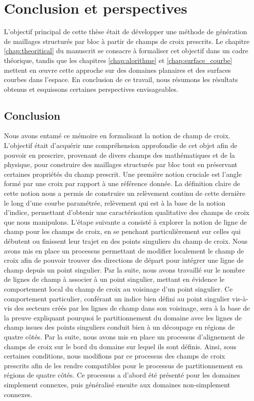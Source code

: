 \chapter{Conclusion et perspectives}
\label{chap:conclusion}

L'objectif principal de cette thèse était de développer une méthode de génération de maillages structurés par bloc à partir de champs de croix prescrits. Le chapitre \ref{chap:theoritical} du manuscrit se consacre à formaliser cet objectif dans un cadre théorique, tandis que les chapitres \ref{chap:alorithme} et \ref{chap:surface_courbe} mettent en œuvre cette approche sur des domaines planaires et des surfaces courbes dans l'espace. En conclusion de ce travail, nous résumons les résultats obtenus et esquissons certaines perspectives envisageables.

\section{Conclusion}

Nous avons entamé ce mémoire en formalisant la notion de champ de croix. L'objectif était d'acquérir une compréhension approfondie de cet objet afin de pouvoir en prescrire, provenant de divers champs des mathématiques et de la physique, pour construire des maillages structurés par bloc tout en préservant certaines propriétés du champ prescrit. Une première notion cruciale est l'angle formé par une croix par rapport à une référence donnée. La définition claire de cette notion nous a permis de construire un relèvement continu de cette dernière le long d'une courbe paramétrée, relèvement qui est à la base de la notion d'indice, permettant d'obtenir une caractérisation qualitative des champs de croix que nous manipulons. L'étape suivante a consisté à explorer la notion de ligne de champ pour les champs de croix, en se penchant particulièrement sur celles qui débutent ou finissent leur trajet en des points singuliers du champ de croix. Nous avons mis en place un processus permettant de modifier localement le champ de croix afin de pouvoir trouver des directions de départ pour intégrer une ligne de champ depuis un point singulier. Par la suite, nous avons travaillé sur le nombre de lignes de champ à associer à un point singulier, mettant en évidence le comportement local du champ de croix au voisinage d'un point singulier. Ce comportement particulier, conférant un indice bien défini au point singulier vis-à-vis des secteurs créés par les lignes de champ dans son voisinage, sera à la base de la preuve expliquant pourquoi le partitionnement du domaine avec les lignes de champ issues des points singuliers conduit bien à un découpage en régions de quatre côtés. Par la suite, nous avons mis en place un processus d'alignement de champs de croix sur le bord du domaine sur lequel ils sont définis. Ainsi, sous certaines conditions, nous modifions par ce processus des champs de croix prescrits afin de les rendre compatibles pour le processus de partitionnement en régions de quatre côtés. Ce processus a d'abord été présenté pour les domaines simplement connexes, puis généralisé ensuite aux domaines non-simplement connexes.

